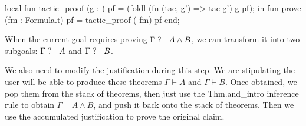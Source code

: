 \nwenddocs{}\endmoddef\nwstartdeflinemarkup{}\nwenddeflinemarkup
local
  fun tactic_proof (g : ) pf =
    (foldl (fn (tac, g') => tac g')
                           g
                           pf);
in
fun prove (fm : Formula.t) pf =
  tactic_proof ( fm) pf
end;
\eatline
{}\nwendcode{}\nwdocspar
\begin{node}
When the current goal requires proving $\Gamma\mathrel{?\!-} A\land B$,
we can transform it into two subgoals: $\Gamma\mathrel{?\!-} A$ and
$\Gamma\mathrel{?\!-} B$.

We also need to modify the justification during this step. We are
stipulating the user will be able to produce these theorems
$\Gamma\vdash A$ and $\Gamma\vdash B$. Once obtained, we pop them from
the stack of theorems, then just use the
{\Tt{}Thm.and{\_}intro\nwendquote} inference rule to obtain $\Gamma\vdash A\land B$,
and push it back onto the stack of theorems. Then we use the
accumulated justification to prove the original claim.
\end{node}

